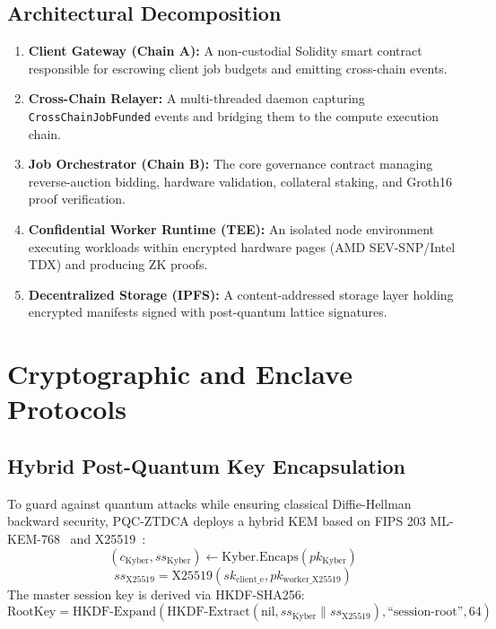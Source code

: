 \documentclass[conference]{IEEEtran}
\begin{document}
\subsection{Architectural Decomposition}
\begin{enumerate}
    \item \textbf{Client Gateway (Chain A):} A non-custodial Solidity smart contract responsible for escrowing client job budgets and emitting cross-chain events.
    \item \textbf{Cross-Chain Relayer:} A multi-threaded daemon capturing \texttt{CrossChainJobFunded} events and bridging them to the compute execution chain.
    \item \textbf{Job Orchestrator (Chain B):} The core governance contract managing reverse-auction bidding, hardware validation, collateral staking, and Groth16 proof verification.
    \item \textbf{Confidential Worker Runtime (TEE):} An isolated node environment executing workloads within encrypted hardware pages (AMD SEV-SNP/Intel TDX) and producing ZK proofs.
    \item \textbf{Decentralized Storage (IPFS):} A content-addressed storage layer holding encrypted manifests signed with post-quantum lattice signatures.
\end{enumerate}

\section{Cryptographic and Enclave Protocols}

\subsection{Hybrid Post-Quantum Key Encapsulation}
To guard against quantum attacks while ensuring classical Diffie-Hellman backward security, PQC-ZTDCA deploys a hybrid KEM based on FIPS 203 ML-KEM-768~\cite{nist_fips_203} and X25519~\cite{rfc7748}:
\begin{equation}
(c_{\text{Kyber}}, ss_{\text{Kyber}}) \leftarrow \text{Kyber.Encaps}(pk_{\text{Kyber}})
\end{equation}
\begin{equation}
ss_{\text{X25519}} = \text{X25519}(sk_{\text{client\_e}}, pk_{\text{worker\_X25519}})
\end{equation}
The master session key is derived via HKDF-SHA256:
\begin{equation}
\text{RootKey} = \text{HKDF-Expand}(\text{HKDF-Extract}(\text{nil}, ss_{\text{Kyber}} \parallel ss_{\text{X25519}}), \text{``session-root''}, 64)
\end{equation}
\end{document}
